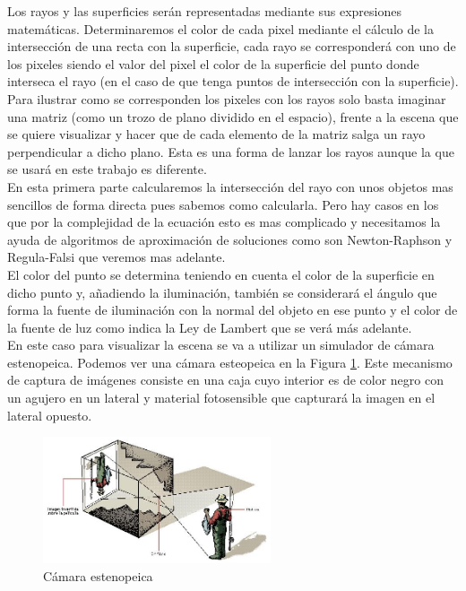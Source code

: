 Los rayos y las superficies serán representadas mediante sus expresiones matemáticas. Determinaremos el color de cada pixel mediante el cálculo de la intersección de una recta con la superficie, cada rayo se corresponderá con uno de los pixeles siendo el valor del pixel el color de la superficie del punto donde interseca el rayo (en el caso de que tenga puntos de intersección con la superficie). Para ilustrar como se corresponden los pixeles con los rayos solo basta imaginar una matriz (como un trozo de plano dividido en el espacio), frente a la escena que se quiere visualizar y hacer que de cada elemento de la matriz salga un rayo perpendicular a dicho plano. Esta es una forma de lanzar los rayos aunque la que se usará en este trabajo es diferente.
	${ }$\\	
	
	En esta primera parte calcularemos la intersección del rayo con unos objetos mas sencillos de forma directa pues sabemos como calcularla. Pero hay casos en los que por la complejidad de la ecuación esto es mas complicado y necesitamos la ayuda de algoritmos de aproximación de soluciones como son Newton-Raphson y Regula-Falsi que veremos mas adelante.
	${ }$\\
	
El color del punto se determina teniendo en cuenta el color de la superficie en dicho punto y, añadiendo la iluminación, también se considerará el ángulo que forma la fuente de iluminación con la normal del objeto en ese punto y el color de la fuente de luz como indica la Ley de Lambert que se verá más adelante.
	${ }$\\	

En este caso para visualizar la escena se va a utilizar un simulador de cámara estenopeica. Podemos ver una cámara esteopeica en la Figura \ref{fig:etiq_1}. Este mecanismo de captura de imágenes consiste en una caja cuyo interior es de color negro con un agujero en un lateral y material fotosensible que capturará la imagen en el lateral opuesto.
	${ }$\\	


\begin{figure}[h]
	\begin{center}
		\includegraphics[width=0.6\textwidth]{imagenes/camara-estenopeica.jpg}
	\end{center}
	\caption{Cámara estenopeica}
	\label{fig:etiq_1}
\end{figure}

